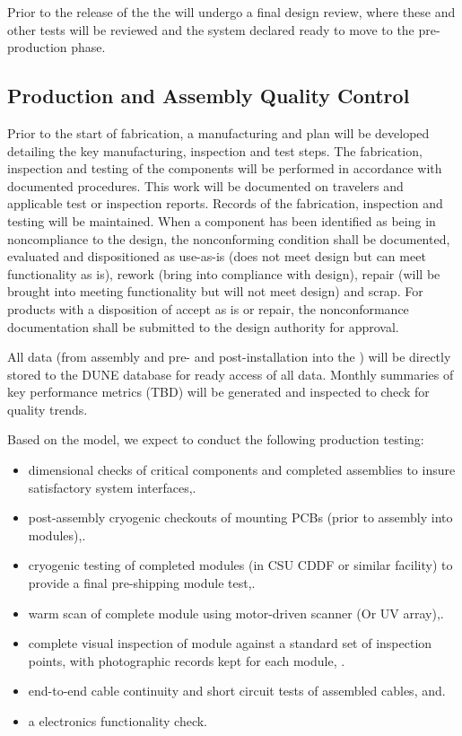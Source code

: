Prior to the release of the  the  will undergo a final design review, where these and other  tests will be reviewed and the system declared ready to move to the pre-production phase.


\subsection{Production and Assembly Quality Control}
\label{sec:fdsp-pd-prodqc}

Prior to the start of fabrication, a manufacturing and  plan will be developed detailing the key manufacturing, inspection and test steps.  The fabrication, inspection and testing of the components will be performed in accordance with documented procedures. This work will be documented on travelers and applicable test or inspection reports. Records of the fabrication, inspection and testing will be maintained. When a component has been identified as being in noncompliance to the design, the nonconforming condition shall be documented, evaluated and dispositioned as use-as-is (does not meet design but can meet functionality as is), rework (bring into compliance with design), repair (will be brought into meeting functionality but will not meet design) and scrap. For products with a disposition of accept as is or repair, the nonconformance documentation shall be submitted to the design authority for approval.   

All  data  (from assembly and pre- and post-installation into the ) will be directly stored to the DUNE database for ready access of all  data.  Monthly summaries of key performance metrics (TBD) will be generated and inspected to check for quality trends.

Based on the  model, we expect to conduct the following production testing:
\begin{itemize}
\item dimensional checks of critical components and completed assemblies to insure satisfactory system interfaces,.
\item post-assembly cryogenic checkouts of  mounting PCBs (prior to assembly into  modules),.
\item cryogenic testing of completed modules (in CSU CDDF or similar facility) to provide a final pre-shipping module test,.
\item warm scan of complete module using motor-driven  scanner (Or UV   array),.
\item complete visual inspection of module against a standard set of inspection points, with photographic records kept for each module, .
\item end-to-end cable continuity and short circuit tests of assembled cables, and.
\item a  electronics functionality check.
\end{itemize}

